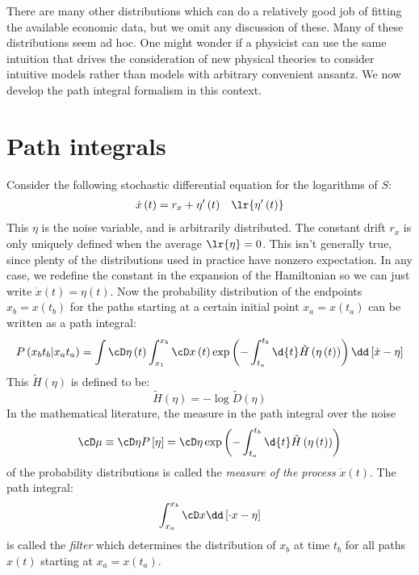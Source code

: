 \documentclass{booc}
\begin{document}
There are many other distributions which can do a relatively good job
of fitting the available economic data, but we omit any discussion of these. 
Many of these distributions seem ad hoc. One might wonder if a physicist can use
the same intuition that drives the consideration of new physical theories to
consider intuitive models rather than models with arbitrary convenient ansantz.
We now develop the path integral formalism in this context.

\section{Path integrals}

Consider the following stochastic differential equation for the logarithms of $S$:
\begin{align}
\dot x\left( t \right) = r_x + \eta'\left( t \right)
&&
\lr{\eta'\left( t \right)}
\end{align}
This $\eta$ is the noise variable, and is arbitrarily distributed.
The constant drift $r_x$ is only uniquely defined when the average $\lr{\eta} = 0$.
This isn't generally true, since plenty of the distributions used in practice have nonzero expectation.
In any case, we redefine the constant in the expansion of the Hamiltonian so we
can just write $\dot x\left( t \right) = \eta\left( t \right)$.
Now the probability distribution of the endpoints $x_b = x\left( t_b \right)$
for the paths starting at a certain initial point $x_a = x\left( t_a \right)$
can be written as a path integral:
\begin{equation}
P\left( x_b t_b \vert x_a t_a \right) = 
\int \cD \eta\left( t \right) \int_{x_1}^{x_b}
\cD x\left( t \right)
\exp\left( -\int_{t_a}^{t_b} \d{t} \tilde H\left( \eta\left( t \right) \right)
\right)
\dd\left[ \dot x - \eta \right]
\label{eqn:fin_path_int}
\end{equation}
This $\tilde H\left( \eta \right)$ is defined to be:
\begin{equation}
\tilde H\left( \eta \right) = 
-\log \tilde D\left( \eta \right)
\end{equation}
In the mathematical literature, the measure in the path integral over the noise
\begin{equation}
\cD \mu \equiv \cD \eta P\left[ \eta \right] = 
\cD \eta \exp\left( - \int_{t_a}^{t_b} \d{t} \tilde H\left( \eta\left( t \right) \right) \right)
\end{equation}
of the probability distributions is called the \emph{measure of the process}
$\dot x\left( t \right)$. 
The path integral:
\begin{equation}
\int_{x_a}^{x_b} \cD x \dd\left[ \cdot x - \eta \right]
\end{equation}
is called the \emph{filter} which determines the distribution of $x_b$
at time $t_b$ for all paths $x\left( t \right)$ starting at $x_a = x\left( t_a \right)$. 
\end{document}

